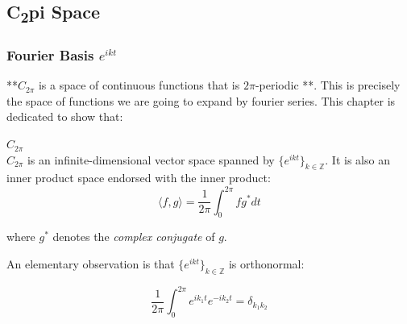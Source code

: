 \subsection{C\textsubscript{2}pi Space}

%
\providecommand{\argmin}{\operatorname*{arg\,min}}%
\providecommand{\argmax}{\operatorname*{arg\,max}}%
\subsubsection{Fourier Basis $e^{ikt}$}

**$C_{2\pi}$  is a space of  continuous functions that is $2\pi$-periodic **. This is precisely the space of functions we are going to expand by fourier series. This chapter is dedicated to show that:

\begin{theorem}\textbf{$C_{2\pi}$}\\
$C_{2\pi}$ is an infinite-dimensional vector space spanned by $\{e^{ikt}\}_{k\in\mathbb{Z}}$. It is also an inner product space endorsed with the inner product:
\begin{equation}
\langle f,g \rangle = \frac{1}{2\pi}\int_{0}^{2\pi} fg^*dt
\end{equation}

\end{theorem}where $g^*$ denotes the \textit{complex conjugate} of $g$.

An elementary observation is that  $\{e^{ikt}\}_{k\in\mathbb{Z}}$ is orthonormal:

\begin{equation}
\frac{1}{2\pi}\int_0^{2\pi}e^{ik_1t}e^{-ik_2t}=\delta_{k_1k_2}
\end{equation}

